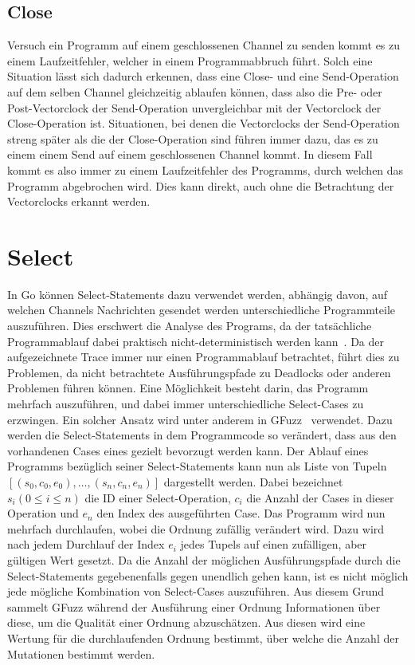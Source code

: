 \subsection{Close}
Versuch ein Programm auf einem geschlossenen Channel zu senden kommt es zu einem Laufzeitfehler, 
welcher in einem Programmabbruch führt. Solch eine Situation lässt sich 
dadurch erkennen, dass eine Close- und eine Send-Operation auf dem selben Channel
gleichzeitig ablaufen können, dass also die Pre- oder Post-Vectorclock 
der Send-Operation unvergleichbar mit der Vectorclock der Close-Operation 
ist. Situationen, bei denen die Vectorclocks der Send-Operation streng später 
als die der Close-Operation sind führen immer dazu, das es zu einem einem 
Send auf einem geschlossenen Channel kommt. In diesem Fall kommt es also immer 
zu einem Laufzeitfehler des Programms, durch welchen das Programm abgebrochen wird.
Dies kann direkt, auch ohne die Betrachtung der Vectorclocks erkannt werden. 

\section{Select}\label{Chap:Back-Sec:Select}
In Go können Select-Statements dazu verwendet werden, abhängig davon, 
auf welchen Channels Nachrichten gesendet werden unterschiedliche Programmteile
auszuführen. Dies erschwert die Analyse des Programs, da der 
tatsächliche Programmablauf dabei praktisch nicht-deterministisch werden 
kann~\cite{select-spec}. Da der aufgezeichnete Trace immer nur einen 
Programmablauf betrachtet, führt dies zu Problemen, da 
nicht betrachtete Ausführungspfade zu Deadlocks oder anderen Problemen 
führen können. Eine Möglichkeit besteht darin, das Programm mehrfach auszuführen, 
und dabei immer unterschiedliche Select-Cases zu erzwingen. Ein solcher 
Ansatz wird unter anderem in GFuzz~\cite{gfuzz} verwendet. Dazu werden die 
Select-Statements in dem Programmcode so verändert, dass aus den vorhandenen 
Cases eines gezielt bevorzugt werden kann.
Der Ablauf eines Programms bezüglich seiner 
Select-Statements kann nun als Liste von Tupeln 
$[(s_0, c_0, e_0), \ldots, (s_n, c_n, e_n)]$ dargestellt werden. Dabei 
bezeichnet $s_i (0 \leq i \leq n)$ die ID einer Select-Operation, $c_i$ 
die Anzahl der Cases in dieser Operation und $e_n$ den Index des ausgeführten 
Case. Das Programm wird nun mehrfach durchlaufen, wobei die Ordnung zufällig 
verändert wird. Dazu wird nach jedem Durchlauf der Index $e_i$ jedes Tupels 
auf einen zufälligen, aber gültigen Wert gesetzt. Da die Anzahl der möglichen 
Ausführungspfade durch die Select-Statements gegebenenfalls gegen unendlich gehen kann,
ist es nicht möglich jede mögliche Kombination von Select-Cases auszuführen.
Aus diesem Grund sammelt GFuzz während der Ausführung einer Ordnung Informationen 
über diese, um die Qualität einer Ordnung abzuschätzen. Aus diesen wird 
eine Wertung für die durchlaufenden Ordnung bestimmt, über welche die 
Anzahl der Mutationen bestimmt werden. 

